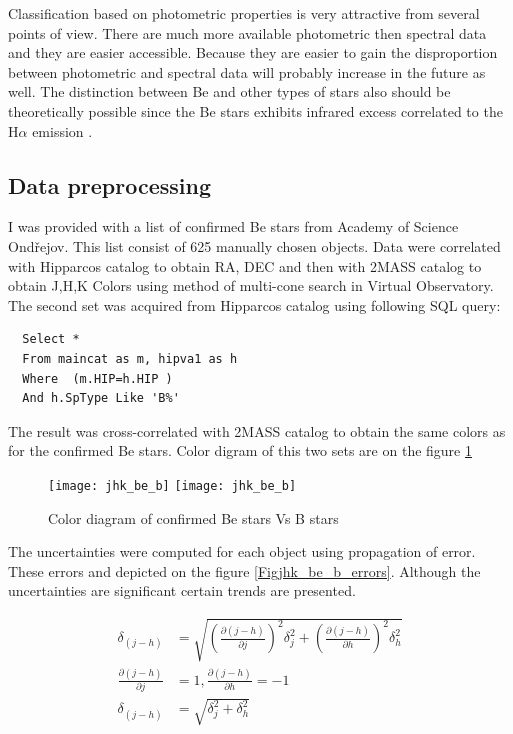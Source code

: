 Classification based on photometric properties is very attractive from
several points of view. There are much more available photometric then
spectral data and they are easier accessible. Because they are easier
to gain the disproportion between photometric and spectral data will
probably increase in the future as well. The distinction between Be
and other types of stars also should be theoretically possible since
the Be stars exhibits infrared excess correlated to the H$\alpha$
emission \cite{van1995halpha}.

\subsection{Data preprocessing}

I was provided with a list of confirmed Be stars from Academy of Science
Ondřejov. This list consist of 625 manually chosen objects. Data were
correlated with Hipparcos \cite{perryman1997hipparcos} catalog to
obtain RA, DEC and then with 2MASS\cite{2006AJ131.1163S} catalog to
obtain J,H,K Colors using method of multi-cone search in Virtual
Observatory. The second set was acquired from Hipparcos catalog using
following SQL query:

\begin{lstlisting}
  Select * 
  From maincat as m, hipva1 as h 
  Where  (m.HIP=h.HIP )  
  And h.SpType Like 'B%'
\end{lstlisting}

The result was cross-correlated with 2MASS catalog to obtain the same
colors as for the confirmed Be stars. Color digram of this two sets
are on the figure \ref{Figjhk_be_b}

    \begin{figure}[!htbp]
      \begin{center}
        \leavevmode
        \ifpdf
        \texttt{[image: jhk\_be\_b]}
        \else
        \texttt{[image: jhk\_be\_b]}
        \fi
        \caption{Color diagram of confirmed Be stars Vs B stars}
        \label{Figjhk_be_b}
      \end{center}
    \end{figure}

    The uncertainties were computed for each object using propagation
    of error. These errors and depicted on the figure
    \ref{Figjhk_be_b_errors}. Although the uncertainties are
    significant certain trends are presented.

\begin{align*}
  \delta_{(j - h)} &= \sqrt{\left(\frac{\partial(j - h) }{\partial
        j}\right)^2\delta_j^2 + \left(\frac{\partial(j - h) }{\partial
        h}\right)^2\delta_h^2} \\
  \frac{\partial(j - h) }{\partial j } &= 1,\frac{\partial(j - h)
  }{\partial h } = -1 \\
  \delta_{(j - h)} &= \sqrt{\delta_j^2 + \delta_h^2}
\end{align*}


